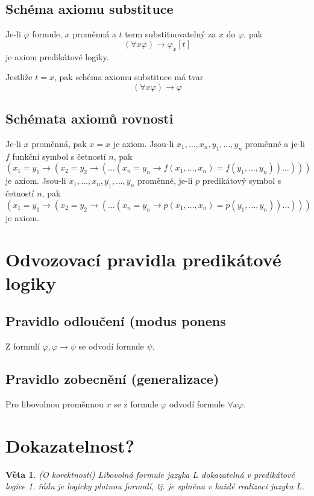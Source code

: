 \documentclass[a4paper, 11pt]{report}
\newtheorem{veta}{Věta}[chapter]
\begin{document}
\subsection{Schéma axiomu substituce}
Je-li $\varphi$ formule, $x$ proměnná a $t$ term substituovatelný za $x$ do $\varphi$, pak
$$ (\forall x \varphi) \to \varphi_x[t] $$
je axiom predikátové logiky.

Jestliže $t = x$, pak schéma axiomu substituce má tvar
$$ (\forall x \varphi) \to \varphi $$


\subsection{Schémata axiomů rovnosti}
Je-li $x$ proměnná, pak $x = x$ je axiom. Jsou-li $x_1, \dots, x_n, y_1, \dots, y_n$ proměnné a je-li $f$ funkční symbol s četností $n$, pak
$$(x_1 = y_1 \to (x_2 = y_2 \to ( \dots (x_n = y_n \to f(x_1, \dots, x_n) = f(y_1, \dots, y_n)) \dots ))) $$
je axiom. Jsou-li $x_1, \dots, x_n, y_1, \dots, y_n$ proměnné, je-li $p$ predikátový symbol s četností $n$, pak
$$(x_1 = y_1 \to (x_2 = y_2 \to ( \dots (x_n = y_n \to p(x_1, \dots, x_n) = p(y_1, \dots, y_n)) \dots ))) $$
je axiom.

\section{Odvozovací pravidla predikátové logiky}

\subsection{Pravidlo odloučení (modus ponens}
Z formulí $\varphi, \varphi \to \psi$ se odvodí formule $\psi$.

\subsection{Pravidlo zobecnění (generalizace)}
Pro libovolnou proměnnou $x$ se z formule $\varphi$ odvodí formule $\forall x \varphi$.


\section{Dokazatelnost?}
\begin{veta}
(O korektnosti) Libovolná formule jazyka $L$ dokazatelná v predikátové logice 1. řádu je logicky platnou formulí, tj. je splněna v každé realizaci jazyka L.
\end{veta}
\end{document}
